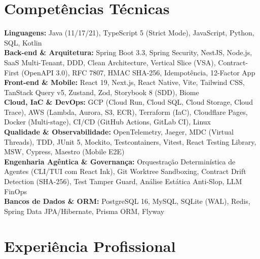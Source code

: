\documentclass[10pt, letterpaper]{article}
\begin{document}
\section*{Compet\^encias T\'ecnicas}
\noindent\textbf{Linguagens:} Java (11/17/21), TypeScript 5 (Strict Mode), JavaScript, Python, SQL, Kotlin \\
\textbf{Back-end \& Arquitetura:} Spring Boot 3.3, Spring Security, NestJS, Node.js, SaaS Multi-Tenant, DDD, Clean Architecture, Vertical Slice (VSA), Contract-First (OpenAPI 3.0), RFC 7807, HMAC SHA-256, Idempot\^encia, 12-Factor App \\
\textbf{Front-end \& Mobile:} React 19, Next.js, React Native, Vite, Tailwind CSS, TanStack Query v5, Zustand, Zod, Storybook 8 (SDD), Biome \\
\textbf{Cloud, IaC \& DevOps:} GCP (Cloud Run, Cloud SQL, Cloud Storage, Cloud Trace), AWS (Lambda, Aurora, S3, ECR), Terraform (IaC), Cloudflare Pages, Docker (Multi-stage), CI/CD (GitHub Actions, GitLab CI), Linux \\
\textbf{Qualidade \& Observabilidade:} OpenTelemetry, Jaeger, MDC (Virtual Threads), TDD, JUnit 5, Mockito, Testcontainers, Vitest, React Testing Library, MSW, Cypress, Maestro (Mobile E2E) \\
\textbf{Engenharia Ag\^entica \& Governan\c{c}a:} Orquestra\c{c}\~ao Determin\'istica de Agentes (CLI/TUI com React Ink), Git Worktree Sandboxing, Contract Drift Detection (SHA-256), Test Tamper Guard, An\'alise Est\'atica Anti-Slop, LLM FinOps \\
\textbf{Bancos de Dados \& ORM:} PostgreSQL 16, MySQL, SQLite (WAL), Redis, Spring Data JPA/Hibernate, Prisma ORM, Flyway

\section*{Experi\^encia Profissional}
\end{document}
